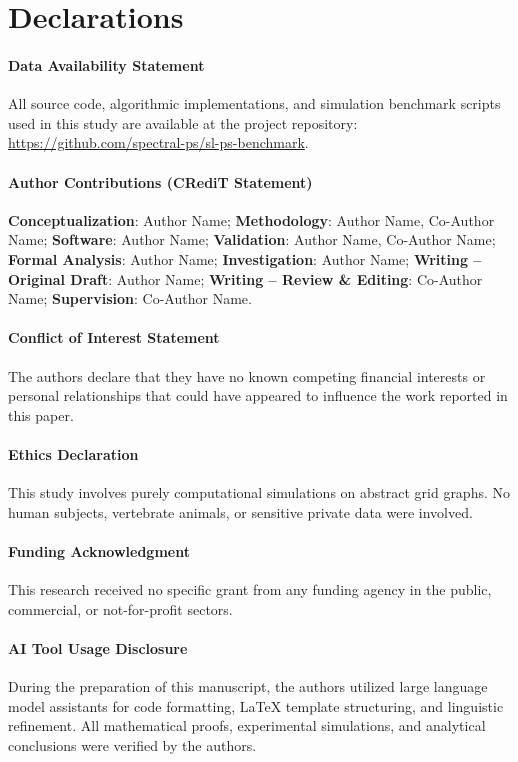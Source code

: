 \documentclass[11pt,a4paper]{article}
\begin{document}
\section*{Declarations}

\paragraph{Data Availability Statement}
All source code, algorithmic implementations, and simulation benchmark scripts used in this study are available at the project repository: \url{https://github.com/spectral-ps/sl-ps-benchmark}.

\paragraph{Author Contributions (CRediT Statement)}
\textbf{Conceptualization}: Author Name; \textbf{Methodology}: Author Name, Co-Author Name; \textbf{Software}: Author Name; \textbf{Validation}: Author Name, Co-Author Name; \textbf{Formal Analysis}: Author Name; \textbf{Investigation}: Author Name; \textbf{Writing -- Original Draft}: Author Name; \textbf{Writing -- Review \& Editing}: Co-Author Name; \textbf{Supervision}: Co-Author Name.

\paragraph{Conflict of Interest Statement}
The authors declare that they have no known competing financial interests or personal relationships that could have appeared to influence the work reported in this paper.

\paragraph{Ethics Declaration}
This study involves purely computational simulations on abstract grid graphs. No human subjects, vertebrate animals, or sensitive private data were involved.

\paragraph{Funding Acknowledgment}
This research received no specific grant from any funding agency in the public, commercial, or not-for-profit sectors.

\paragraph{AI Tool Usage Disclosure}
During the preparation of this manuscript, the authors utilized large language model assistants for code formatting, LaTeX template structuring, and linguistic refinement. All mathematical proofs, experimental simulations, and analytical conclusions were verified by the authors.
\end{document}
